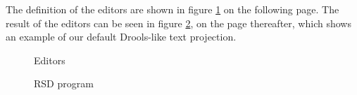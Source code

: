 The definition of the editors are shown in figure \ref{fig:RSDEditors} on the following page.
The result of the editors can be seen in figure \ref{fig:RSDProgram}, on the page thereafter, which shows an example of our default Drools-like text projection.


\begin{figure}
    \centering
    \caption{Editors}
    \label{fig:RSDEditors}
\end{figure}


\begin{figure}
    \centering
    \caption{RSD program}
    \label{fig:RSDProgram}
\end{figure}

